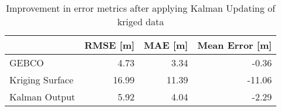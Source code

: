 \begin{table}
\centering
\caption{Improvement in error metrics after applying Kalman Updating of kriged data}
\label{tab:oahu8_gebco_raster_error}
\begin{tabular}{lrrr}
\toprule
 & RMSE [m] & MAE [m] & Mean Error [m] \\
\midrule
GEBCO & 4.73 & 3.34 & -0.36 \\
Kriging Surface & 16.99 & 11.39 & -11.06 \\
Kalman Output & 5.92 & 4.04 & -2.29 \\
\bottomrule
\end{tabular}
\end{table}
